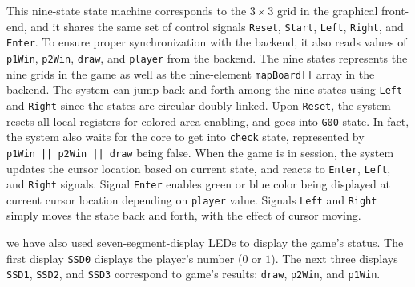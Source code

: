 \documentclass[UTF8,12pt,letterpaper,oneside]{amsart}
\begin{document}
This nine-state state machine corresponds to the $3 \times 3$ grid in the graphical front-end, and it shares the same set of control signals \texttt{Reset}, \texttt{Start}, \texttt{Left}, \texttt{Right}, and \texttt{Enter}. To ensure proper synchronization with the backend, it also reads values of \texttt{p1Win}, \texttt{p2Win}, \texttt{draw}, and \texttt{player} from the backend. The nine states represents the nine grids in the game as well as the nine-element \texttt{mapBoard[]} array in the backend. The system can jump back and forth among the nine states using \texttt{Left} and \texttt{Right} since the states are circular doubly-linked. Upon \texttt{Reset}, the system resets all local registers for colored area enabling, and goes into \texttt{G00} state. In fact, the system also waits for the core to get into \texttt{check} state, represented by \texttt{p1Win\ ||\ p2Win\ ||\ draw} being false. When the game is in session, the system updates the cursor location based on current state, and reacts to \texttt{Enter}, \texttt{Left}, and \texttt{Right} signals. Signal \texttt{Enter} enables green or blue color being displayed at current cursor location depending on \texttt{player} value. Signals \texttt{Left} and \texttt{Right} simply moves the state back and forth, with the effect of cursor moving.

we have also used seven-segment-display LEDs to display the game's status. The first display \texttt{SSD0} displays the player's number ($0$ or $1$). The next three displays \texttt{SSD1}, \texttt{SSD2}, and \texttt{SSD3} correspond to game's results: \texttt{draw}, \texttt{p2Win}, and \texttt{p1Win}.
\end{document}
